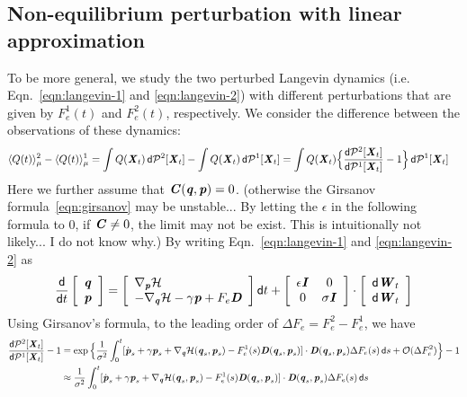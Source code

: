 \documentclass[aip,jcp,a4paper,reprint,onecolumn]{revtex4-1}
\newcommand{\recheck}[1]{{\color{red} #1}}
\newcommand{\vect}[1]{\textbf{\textit{#1}}}
\newcommand{\dd}{\textsf{d}}
\newcommand{\mh}{\mathcal H}
\begin{document}
\subsection{Non-equilibrium perturbation with linear approximation}

To be more general, we study the two perturbed Langevin dynamics
(i.e. Eqn.~\eqref{eqn:langevin-1} and \eqref{eqn:langevin-2}) with
different perturbations that are given by $F_e^1(t)$ and $F_e^2(t)$,
respectively. We consider the difference between the observations of
these dynamics:
\begin{align}\label{eqn:noneq-pert-1}
  \langle Q(t)\rangle_{\mu}^{2}  -\langle Q(t)\rangle_{\mu}^{1}
  &=
  \int Q(\vect X_t) \,\dd\mathcal P^2[\vect X_t]
  -\int Q(\vect X_t) \,\dd\mathcal P^1[\vect X_t]
  =
  \int Q(\vect X_t)
  \Big\{
  \frac{\dd\mathcal P^2[\vect X_t]}{\dd\mathcal P^1[\vect X_t]}
  -1
  \Big\}
  \,\dd\mathcal P^1[\vect X_t]
\end{align}
\recheck{Here we further assume that $\vect C(\vect q, \vect p) = 0$.
  (otherwise the Girsanov formula~\eqref{eqn:girsanov} may be unstable...
  By letting the $\epsilon$ in the following formula to 0, if
  $\vect C\neq 0$, the limit may not be exist. This
  is intuitionally not likely... I do not know why.)}
By writing Eqn.~\eqref{eqn:langevin-1} and \eqref{eqn:langevin-2} as
\begin{align}
  \frac{\dd }{\dd t}
  \left[
    \begin{array}{l}
      \vect q\\
      \vect p
    \end{array}
  \right]
  =
  \left[
    \begin{array}{l}
      \nabla_{\vect p}\mh\\
      -\nabla_{\vect q}\mh - \gamma\vect p + F_e\vect D
    \end{array}
  \right]
  \dd t
  +
  \left[
    \begin{array}{cc}
      \epsilon \vect I & 0\\
      0 & \sigma\vect I
    \end{array}
  \right]
  \cdot
  \left[
    \begin{array}{l}
      \dd\vect W_t\\
      \dd\vect W_t
    \end{array}
  \right]
\end{align}
Using Girsanov's formula, to the leading order of $\Delta F_e = F_e^2 - F_e^1$,
we have
\begin{align}\nonumber
  \frac{\dd\mathcal P^2[\vect X_t]}{\dd\mathcal P^1[\vect X_t]}
  -1
  &=
  \exp
  \Big\{
  \frac 1 {\sigma^2}
  \int_0^t
  [\dot{\vect p}_s +
  \gamma\vect p_s +
  \nabla_{\vect q}\mh(\vect q_s,\vect p_s)
  - F_e^1(s) \vect D(\vect q_s,\vect p_s)
  ]\cdot
  \vect D(\vect q_s,\vect p_s)
  \Delta F_e(s)\,
  \dd s
  + \mathcal O(\Delta F_e^2)
  \Big\} - 1 \\\label{eqn:girsanov-langevin-1}
  &\approx
  \frac 1 {\sigma^2}
  \int_0^t
  [\dot{\vect p}_s +
  \gamma\vect p_s +
  \nabla_{\vect q}\mh(\vect q_s,\vect p_s)
  - F_e^1(s) \vect D(\vect q_s,\vect p_s)
  ]\cdot
  \vect D(\vect q_s,\vect p_s)
  \Delta F_e(s)\,
  \dd s  
\end{align}
\end{document}
